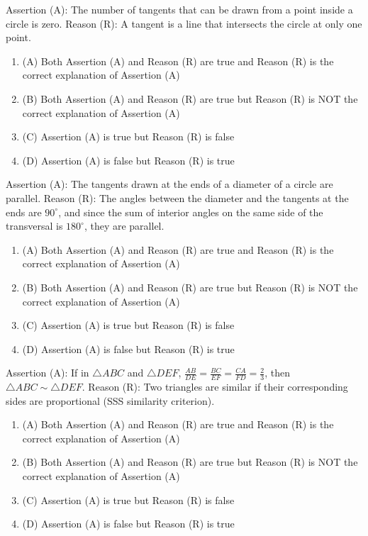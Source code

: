 \documentclass[12pt,a4paper]{exam}
\begin{document}
\begin{questions}
\question[1] Assertion (A): The number of tangents that can be drawn from a point inside a circle is zero. Reason (R): A tangent is a line that intersects the circle at only one point.
\begin{enumerate}[label=(\Alph*)]
  \item (A) Both Assertion (A) and Reason (R) are true and Reason (R) is the correct explanation of Assertion (A)
  \item (B) Both Assertion (A) and Reason (R) are true but Reason (R) is NOT the correct explanation of Assertion (A)
  \item (C) Assertion (A) is true but Reason (R) is false
  \item (D) Assertion (A) is false but Reason (R) is true
\end{enumerate}
\vspace{0.15cm}

\question[1] Assertion (A): The tangents drawn at the ends of a diameter of a circle are parallel. Reason (R): The angles between the diameter and the tangents at the ends are $90^\circ$, and since the sum of interior angles on the same side of the transversal is $180^\circ$, they are parallel.
\begin{enumerate}[label=(\Alph*)]
  \item (A) Both Assertion (A) and Reason (R) are true and Reason (R) is the correct explanation of Assertion (A)
  \item (B) Both Assertion (A) and Reason (R) are true but Reason (R) is NOT the correct explanation of Assertion (A)
  \item (C) Assertion (A) is true but Reason (R) is false
  \item (D) Assertion (A) is false but Reason (R) is true
\end{enumerate}
\vspace{0.15cm}

\question[1] Assertion (A): If in $\triangle ABC$ and $\triangle DEF$, $\frac{AB}{DE} = \frac{BC}{EF} = \frac{CA}{FD} = \frac{2}{3}$, then $\triangle ABC \sim \triangle DEF$. 
 Reason (R): Two triangles are similar if their corresponding sides are proportional (SSS similarity criterion).
\begin{enumerate}[label=(\Alph*)]
  \item (A) Both Assertion (A) and Reason (R) are true and Reason (R) is the correct explanation of Assertion (A)
  \item (B) Both Assertion (A) and Reason (R) are true but Reason (R) is NOT the correct explanation of Assertion (A)
  \item (C) Assertion (A) is true but Reason (R) is false
  \item (D) Assertion (A) is false but Reason (R) is true
\end{enumerate}
\vspace{0.15cm}


\end{questions}
\end{document}
